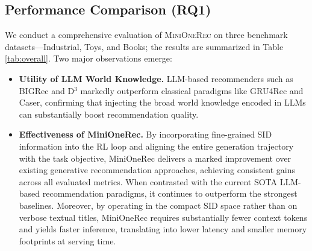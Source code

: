 \subsection{Performance Comparison (RQ1)}

We conduct a comprehensive evaluation of \textsc{MiniOneRec} on three benchmark datasets—Industrial, Toys, and Books; the results are summarized in Table \ref{tab:overall}. Two major observations emerge:

\begin{itemize}[leftmargin=*]
    \item \textbf{Utility of LLM World Knowledge.} LLM-based recommenders such as BIGRec and D$^3$ markedly outperform classical paradigms like GRU4Rec and Caser, confirming that injecting the broad world knowledge encoded in LLMs can substantially boost recommendation quality.
    \item \textbf{Effectiveness of MiniOneRec.} By incorporating fine-grained SID information into the RL loop and aligning the entire generation trajectory with the task objective, MiniOneRec delivers a marked improvement over existing generative recommendation approaches, achieving consistent gains across all evaluated metrics. When contrasted with the current SOTA LLM-based recommendation paradigms, it continues to outperform the strongest baselines. Moreover, by operating in the compact SID space rather than on verbose textual titles, MiniOneRec requires substantially fewer context tokens and yields faster inference, translating into lower latency and smaller memory footprints at serving time.
\end{itemize}

